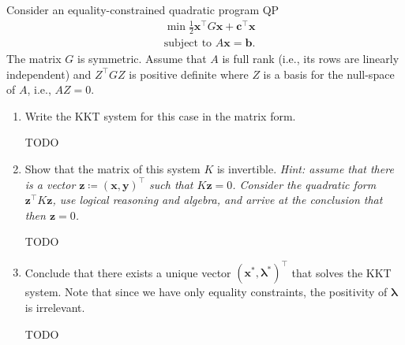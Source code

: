 \documentclass{../kin_math}
\begin{document}
\begin{questions}
  \question Consider an equality-constrained quadratic program QP
  \begin{align*}
    &\min \frac{1}{2} \textbf{x}^\top G \textbf{x} + \textbf{c}^\top \textbf{x} \\
    &\text{subject to } A \textbf{x} = \textbf{b}.
  \end{align*}
  The matrix $G$ is symmetric. Assume that $A$ is full rank (i.e., its rows are linearly independent) and $Z^\top GZ$ is positive definite where $Z$ is a basis for the null-space of $A$, i.e., $AZ = 0$.
  \begin{enumerate}
    \item Write the KKT system for this case in the matrix form.
    \begin{solution}
      TODO
    \end{solution}
    \item Show that the matrix of this system $K$ is invertible. \emph{Hint: assume that there is a vector $\textbf{z} \coloneqq (\textbf{x}, \textbf{y})^\top$ such that $K \textbf{z} = 0$. Consider the quadratic form $\textbf{z}^\top K \textbf{z}$, use logical reasoning and algebra, and arrive at the conclusion that then $\textbf{z} = 0$.}
    \begin{solution}
      TODO
    \end{solution}
    \item Conclude that there exists a unique vector $(\textbf{x}^*, \boldsymbol{\lambda}^*)^\top$ that solves the KKT system. Note that since we have only equality constraints, the positivity of $\boldsymbol{\lambda}$ is irrelevant.
    \begin{solution}
      TODO
    \end{solution}
  \end{enumerate}


\end{questions}
\end{document}
